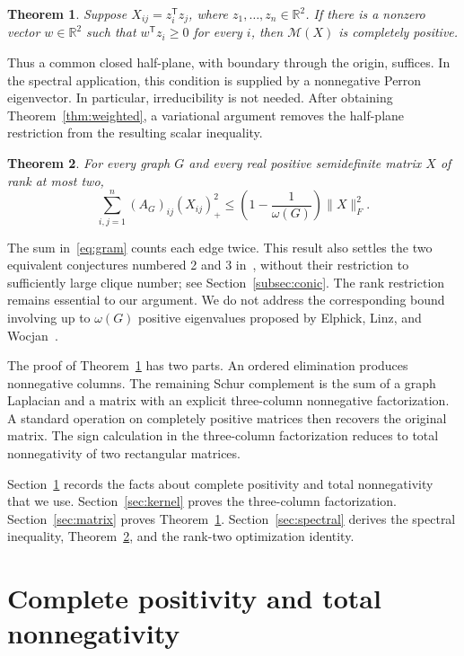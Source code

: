 \documentclass[11pt]{article}
\newtheorem{theorem}{Theorem}[section]
\theoremstyle{remark}
\newcommand{\R}{\mathbb R}
\newcommand{\M}{\mathcal M}
\newcommand{\fro}[1]{\lVert #1\rVert_F}
\begin{document}
\begin{theorem}\label{thm:matrix}
Suppose $X_{ij}=z_i^{\mathsf T}z_j$, where $z_1,\ldots,z_n\in\R^2$.
If there is a nonzero vector $w\in\R^2$ such that
$w^{\mathsf T}z_i\ge0$ for every $i$, then $\M(X)$ is completely positive.
\end{theorem}

Thus a common closed half-plane, with boundary through the origin, suffices.
In the spectral application, this condition is supplied by a nonnegative
Perron eigenvector. In particular, irreducibility is not needed.
After obtaining Theorem~\ref{thm:weighted}, a variational argument removes
the half-plane restriction from the resulting scalar inequality.

\begin{theorem}\label{thm:gram}
For every graph $G$ and every real positive semidefinite matrix $X$ of rank
at most two,
\begin{equation}\label{eq:gram}
 \sum_{i,j=1}^n(A_G)_{ij}(X_{ij})_+^2
 \le\left(1-\frac1{\omega(G)}\right)\fro{X}^2.
\end{equation}
\end{theorem}

The sum in~\eqref{eq:gram} counts each edge twice.
This result also settles the two equivalent conjectures numbered 2 and 3
in~\cite{CSZ}, without their restriction to sufficiently large clique number;
see Section~\ref{subsec:conic}. The rank restriction remains essential to our
argument. We do not address the corresponding bound involving up to
$\omega(G)$ positive eigenvalues proposed by Elphick, Linz, and
Wocjan~\cite{ELW}.

The proof of Theorem~\ref{thm:matrix} has two parts. An ordered elimination
produces nonnegative columns. The remaining Schur complement is the sum of
a graph Laplacian and a matrix with an explicit three-column nonnegative
factorization. A standard operation on completely positive matrices then
recovers the original matrix. The sign calculation in the three-column
factorization reduces to total nonnegativity of two rectangular matrices.

Section~\ref{sec:prelim} records the facts about complete positivity and
total nonnegativity that we use. Section~\ref{sec:kernel} proves the
three-column factorization. Section~\ref{sec:matrix} proves
Theorem~\ref{thm:matrix}. Section~\ref{sec:spectral} derives the spectral
inequality, Theorem~\ref{thm:gram}, and the rank-two optimization identity.

\section{Complete positivity and total nonnegativity}\label{sec:prelim}
\end{document}
